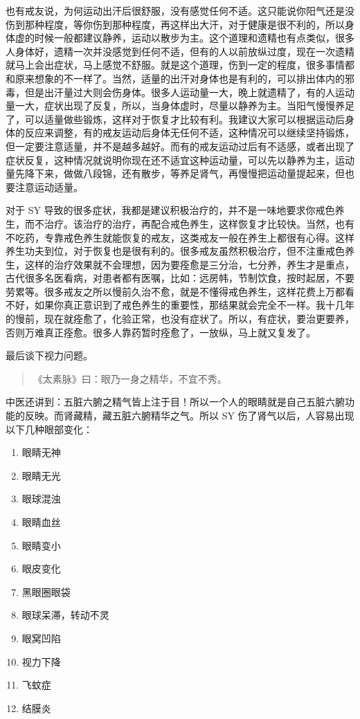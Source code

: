 \documentclass{ctexart}
\begin{document}
也有戒友说，为何运动出汗后很舒服，没有感觉任何不适。这只能说你阳气还是没伤到那种程度，等你伤到那种程度，再这样出大汗，对于健康是很不利的，所以身体虚的时候一般都建议静养，运动以散步为主。这个道理和遗精也有点类似，很多人身体好，遗精一次并没感觉到任何不适，但有的人以前放纵过度，现在一次遗精就马上会出症状，马上感觉不舒服。就是这个道理，伤到一定的程度，很多事情都和原来想象的不一样了。当然，适量的出汗对身体也是有利的，可以排出体内的邪毒，但是出汗量过大则会伤身体。很多人运动量一大，晚上就遗精了，有的人运动量一大，症状出现了反复，所以，当身体虚时，尽量以静养为主。当阳气慢慢养足了，可以适量做些锻炼，这样对于恢复才比较有利。我建议大家可以根据运动后身体的反应来调整，有的戒友运动后身体无任何不适，这种情况可以继续坚持锻炼，但一定要注意适量，并不是越多越好。而有的戒友运动过后有不适感，或者出现了症状反复，这种情况就说明你现在还不适宜这种运动量，可以先以静养为主，运动量先降下来，做做八段锦，还有散步，等养足肾气，再慢慢把运动量提起来，但也要注意运动适量。

对于 SY 导致的很多症状，我都是建议积极治疗的，并不是一味地要求你戒色养生，而不治疗。该治疗的治疗，再配合戒色养生，这样恢复才比较快。当然，也有不吃药，专靠戒色养生就能恢复的戒友，这类戒友一般在养生上都很有心得。这样养生功夫到位，对于恢复也是很有利的。很多戒友虽然积极治疗，但不注重戒色养生，这样的治疗效果就不会理想，因为要痊愈是三分治，七分养，养生才是重点，古代很多名医看病，对患者都有医嘱，比如：远房帏，节制饮食，按时起居，不要劳累等。很多戒友之所以慢前久治不愈，就是不懂得戒色养生，这样花费上万都看不好，如果你真正意识到了戒色养生的重要性，那结果就会完全不一样。我十几年的慢前，现在就痊愈了，化验正常，也没有症状了。所以，有症状，要治更要养，否则万难真正痊愈。很多人靠药暂时痊愈了，一放纵，马上就又复发了。

最后谈下视力问题。

\begin{quote}
    《太素脉》曰：眼乃一身之精华，不宜不秀。
\end{quote}

中医还讲到：五脏六腑之精气皆上注于目！所以一个人的眼睛就是自己五脏六腑功能的反映。而肾藏精，藏五脏六腑精华之气。所以 SY 伤了肾气以后，人容易出现以下几种眼部变化：

\begin{enumerate}
    \item 眼睛无神
    \item 眼睛无光
    \item 眼球混浊
    \item 眼睛血丝
    \item 眼睛变小
    \item 眼皮变化
    \item 黑眼圈眼袋
    \item 眼球呆滞，转动不灵
    \item 眼窝凹陷
    \item 视力下降
    \item 飞蚊症
    \item 结膜炎
\end{enumerate}
\end{document}
